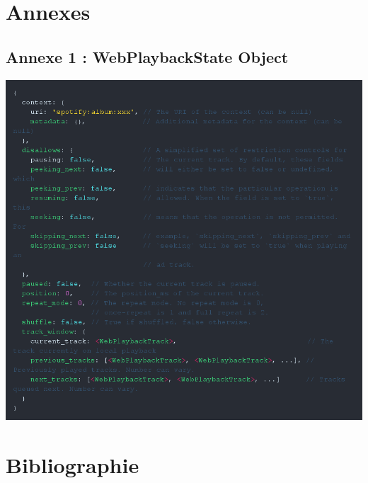 \documentclass{article}
\begin{document}
		\section{Annexes}
				        
		\subsection{Annexe 1 : WebPlaybackState Object }
		\includegraphics[width=\linewidth]{ressources/WebPlaybackState_Object.png}	\label{WebPlaybackState_Object}%
		\newpage
						
		\section{Bibliographie}
		
						
								
\end{document}
